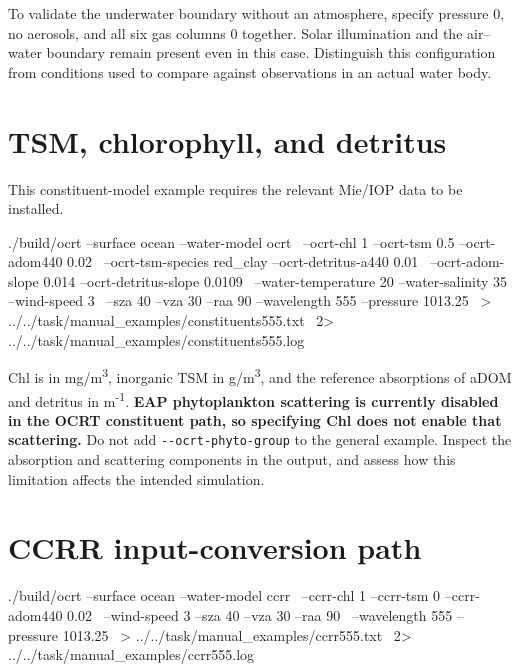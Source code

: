 To validate the underwater boundary without an atmosphere, specify pressure 0, no aerosols, and all six gas columns 0 together. Solar illumination and the air--water boundary remain present even in this case. Distinguish this configuration from conditions used to compare against observations in an actual water body.

\section{TSM, chlorophyll, and detritus}
\label{sec:auto:04_examples:8}
This constituent-model example requires the relevant Mie/IOP data to be installed.


\par\noindent\begin{minipage}{\linewidth}
\begin{ManualCode}
./build/ocrt --surface ocean --water-model ocrt \
  --ocrt-chl 1 --ocrt-tsm 0.5 --ocrt-adom440 0.02 \
  --ocrt-tsm-species red_clay --ocrt-detritus-a440 0.01 \
  --ocrt-adom-slope 0.014 --ocrt-detritus-slope 0.0109 \
  --water-temperature 20 --water-salinity 35 --wind-speed 3 \
  --sza 40 --vza 30 --raa 90 --wavelength 555 --pressure 1013.25 \
  > ../../task/manual_examples/constituents555.txt \
  2> ../../task/manual_examples/constituents555.log
\end{ManualCode}
\end{minipage}\par

Chl is in mg/m\textsuperscript{3}, inorganic TSM in g/m\textsuperscript{3}, and the reference absorptions of aDOM and detritus in m\textsuperscript{-}\textsuperscript{1}. \textbf{EAP phytoplankton scattering is currently disabled in the OCRT constituent path, so specifying Chl does not enable that scattering.} Do not add \texttt{-\allowbreak{}-\allowbreak{}ocrt-\allowbreak{}phyto-\allowbreak{}group} to the general example. Inspect the absorption and scattering components in the output, and assess how this limitation affects the intended simulation.

\Needspace{17\baselineskip}
\section{CCRR input-conversion path}
\label{sec:auto:04_examples:9}

\par\noindent\begin{minipage}{\linewidth}
\begin{ManualCode}
./build/ocrt --surface ocean --water-model ccrr \
  --ccrr-chl 1 --ccrr-tsm 0 --ccrr-adom440 0.02 \
  --wind-speed 3 --sza 40 --vza 30 --raa 90 \
  --wavelength 555 --pressure 1013.25 \
  > ../../task/manual_examples/ccrr555.txt \
  2> ../../task/manual_examples/ccrr555.log
\end{ManualCode}
\end{minipage}\par

